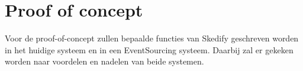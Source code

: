 \section{Proof of concept}
\label{sec:proof-of-concept}

Voor de proof-of-concept zullen bepaalde functies van Skedify geschreven worden in het huidige systeem en in een EventSourcing systeem. Daarbij zal er gekeken worden naar voordelen en nadelen van beide systemen.